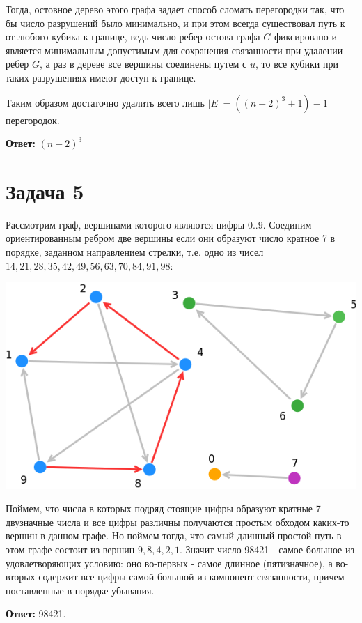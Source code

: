 \documentclass{article}
\begin{document}
	Тогда, остовное дерево этого графа задает способ сломать перегородки так, что бы число разрушений было минимально, и при этом всегда существовал путь к от любого кубика к границе, ведь число ребер остова графа $G$ фиксировано и является минимальным допустимым для сохранения связанности при удалении ребер $G$, а раз в дереве все вершины соединены путем с $u$, то все кубики при таких разрушениях имеют доступ к границе.
	
	Таким образом достаточно удалить всего лишь $|E| = ((n - 2)^3 + 1) - 1$ перегородок.
	
	\textbf{Ответ:} $(n - 2)^3$ 
	
	\section{Задача 5}
	
	Рассмотрим граф, вершинами которого являются цифры $0 .. 9$. Соединим ориентированным ребром две вершины если они образуют число кратное 7 в порядке, заданном направлением стрелки, т.е. одно из чисел \linebreak
	$14, 21, 28, 35, 42, 49, 56, 63, 70, 84, 91, 98$:
	
	\includegraphics[scale=0.6]{5_1}
	
	Поймем, что числа в которых подряд стоящие цифры образуют кратные 7 двузначные числа и все цифры различны получаются простым обходом каких-то вершин в данном графе. Но поймем тогда, что самый длинный простой путь в этом графе состоит из вершин $9, 8, 4, 2, 1$. Значит число 98421 - самое большое из удовлетворяющих условию: оно во-первых - самое длинное (пятизначное), а во-вторых содержит все цифры самой большой из компонент связанности, причем поставленные в порядке убывания.
	
	\textbf{Ответ:} 98421.
	
\end{document}
